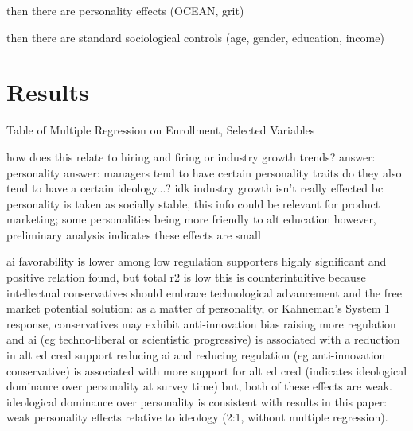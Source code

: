 \documentclass[review]{elsarticle}
\begin{document}
then there are personality effects (OCEAN, grit)

then there are standard sociological controls (age, gender, education, income)

\section{Results}


\begin{table}
    \caption{Table of Multiple Regression on Enrollment, Selected Variables}
    \resizebox{\columnwidth}{!}{
        
    }
    \label{tab:table_new_ols}
\end{table}

how does this relate to hiring and firing or industry growth trends?
answer: personality answer: managers tend to have certain personality traits
do they also tend to have a certain ideology...? idk
industry growth isn't really effected bc personality is taken as socially stable,
this info could be relevant for product marketing; some personalities being more friendly to alt education
however, preliminary analysis indicates these effects are small

%

ai favorability is lower among low regulation supporters
highly significant and positive relation found, but total r2 is low
this is counterintuitive because intellectual conservatives should embrace technological advancement and the free market
potential solution: as a matter of personality, or Kahneman's System 1 response, conservatives may exhibit anti-innovation bias
raising more regulation and ai (eg techno-liberal or scientistic progressive) is associated with a reduction in alt ed cred support
reducing ai and reducing regulation (eg anti-innovation conservative) is associated with more support for alt ed cred (indicates ideological dominance over personality at survey time)
but, both of these effects are weak.
ideological dominance over personality is consistent with results in this paper: weak personality effects relative to ideology (2:1, without multiple regression).
\end{document}
